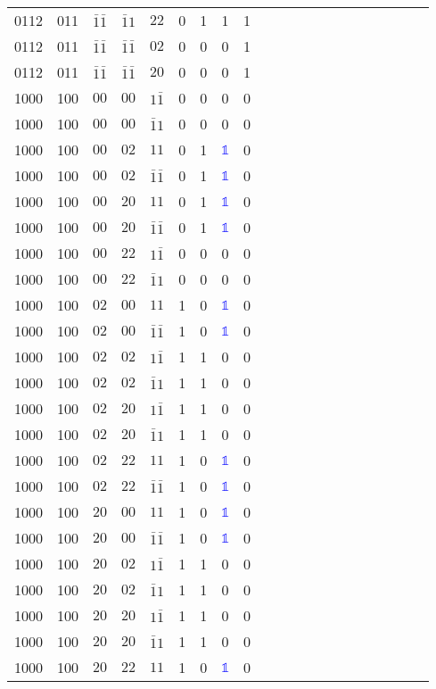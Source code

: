 \begin{longtable*}{c| cccccccccccccccccccc }
0112& 011& $\bar{1}\bar{1}$& $\bar{1}1$& $22$& 0& 1& 1& 1\\
0112& 011& $\bar{1}\bar{1}$& $\bar{1}\bar{1}$& $02$& 0& 0& 0& 1\\
0112& 011& $\bar{1}\bar{1}$& $\bar{1}\bar{1}$& $20$& 0& 0& 0& 1\\
1000& 100& $00$& $00$& $1\bar{1}$& 0& 0& 0& 0\\
1000& 100& $00$& $00$& $\bar{1}1$& 0& 0& 0& 0\\
1000& 100& $00$& $02$& $11$& 0& 1& \textcolor{blue}{$\mathds{1}$}& 0\\
1000& 100& $00$& $02$& $\bar{1}\bar{1}$& 0& 1& \textcolor{blue}{$\mathds{1}$}& 0\\
1000& 100& $00$& $20$& $11$& 0& 1& \textcolor{blue}{$\mathds{1}$}& 0\\
1000& 100& $00$& $20$& $\bar{1}\bar{1}$& 0& 1& \textcolor{blue}{$\mathds{1}$}& 0\\
1000& 100& $00$& $22$& $1\bar{1}$& 0& 0& 0& 0\\
1000& 100& $00$& $22$& $\bar{1}1$& 0& 0& 0& 0\\
1000& 100& $02$& $00$& $11$& 1& 0& \textcolor{blue}{$\mathds{1}$}& 0\\
1000& 100& $02$& $00$& $\bar{1}\bar{1}$& 1& 0& \textcolor{blue}{$\mathds{1}$}& 0\\
1000& 100& $02$& $02$& $1\bar{1}$& 1& 1& 0& 0\\
1000& 100& $02$& $02$& $\bar{1}1$& 1& 1& 0& 0\\
1000& 100& $02$& $20$& $1\bar{1}$& 1& 1& 0& 0\\
1000& 100& $02$& $20$& $\bar{1}1$& 1& 1& 0& 0\\
1000& 100& $02$& $22$& $11$& 1& 0& \textcolor{blue}{$\mathds{1}$}& 0\\
1000& 100& $02$& $22$& $\bar{1}\bar{1}$& 1& 0& \textcolor{blue}{$\mathds{1}$}& 0\\
1000& 100& $20$& $00$& $11$& 1& 0& \textcolor{blue}{$\mathds{1}$}& 0\\
1000& 100& $20$& $00$& $\bar{1}\bar{1}$& 1& 0& \textcolor{blue}{$\mathds{1}$}& 0\\
1000& 100& $20$& $02$& $1\bar{1}$& 1& 1& 0& 0\\
1000& 100& $20$& $02$& $\bar{1}1$& 1& 1& 0& 0\\
1000& 100& $20$& $20$& $1\bar{1}$& 1& 1& 0& 0\\
1000& 100& $20$& $20$& $\bar{1}1$& 1& 1& 0& 0\\
1000& 100& $20$& $22$& $11$& 1& 0& \textcolor{blue}{$\mathds{1}$}& 0\\

\end{longtable*}
